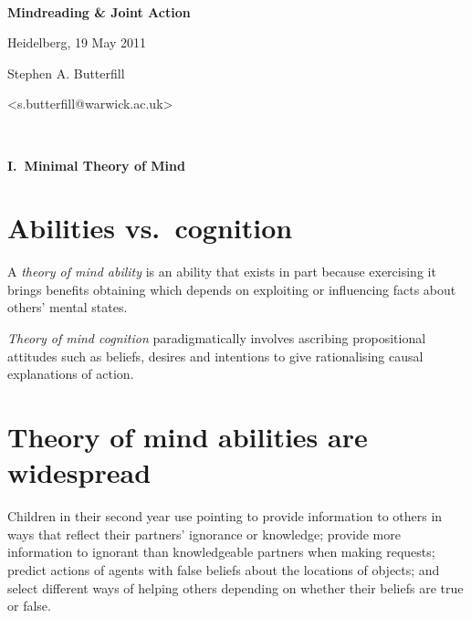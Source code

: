\documentclass[11pt]{extarticle}
\date{}
\begin{document}
\begin{multicols}{3}

\setlength\footnotesep{1em}






\

\begin{center}
{\Large
\textbf{Mindreading \& Joint Action}
}

Heidelberg, 19 May 2011

Stephen A. Butterfill

<s.butterfill@warwick.ac.uk>

\end{center}



\

\begin{center}
{\Large
\textbf{I.\ Minimal Theory of Mind}
}
\end{center}



\section{Abilities vs.\ cognition}

A \emph{theory of mind ability} is an ability that exists in part because exercising it brings benefits obtaining which depends on exploiting or influencing facts about others’ mental states.  

\emph{Theory of mind cognition} paradigmatically involves ascribing propositional attitudes such as beliefs, desires and intentions to give rationalising causal explanations of action. 


\section{Theory of mind abilities are widespread}
Children in their second year use pointing to provide information to others\citep{Liszkowski:2006ec} in ways that reflect their partners’ ignorance or knowledge;\citep{Liszkowski:2008al} provide more information to ignorant than knowledgeable partners when making requests;\citep{ONeill:1996um}  predict actions of agents with false beliefs about the locations of objects;\citep{Onishi:2005hm,Southgate:2007js} and select different ways of helping others depending on whether their beliefs are true or false.\citep{Buttelmann:2009gy}


\end{multicols}
\end{document}
